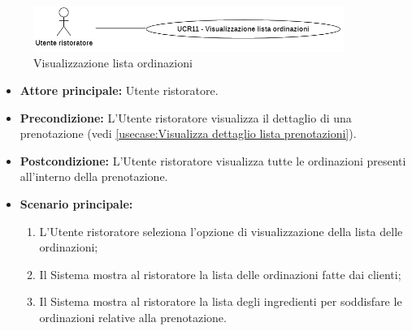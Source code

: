\label{usecase:Visualizzazione lista ordinazioni}

\begin{figure}[h]
	\centering
	\includegraphics[width=0.9\textwidth]{./uml/UCR11.png} 
	\caption{Visualizzazione lista ordinazioni}
	\label{fig:UCR11}
  \end{figure}

\begin{itemize}
	\item \textbf{Attore principale:} Utente ristoratore.

	\item \textbf{Precondizione:} L'Utente ristoratore visualizza il dettaglio di una prenotazione (vedi \autoref{usecase:Visualizza dettaglio lista prenotazioni}).

	\item \textbf{Postcondizione:} L'Utente ristoratore visualizza tutte le
	      ordinazioni presenti all'interno della prenotazione.

	\item \textbf{Scenario principale:}
	      \begin{enumerate}
		      \item L'Utente ristoratore seleziona l'opzione di visualizzazione della lista delle ordinazioni;

		      \item Il Sistema mostra al ristoratore la lista delle ordinazioni fatte dai clienti;

		      \item Il Sistema mostra al ristoratore la lista degli ingredienti per soddisfare le ordinazioni relative alla prenotazione.
	      \end{enumerate}
\end{itemize}
